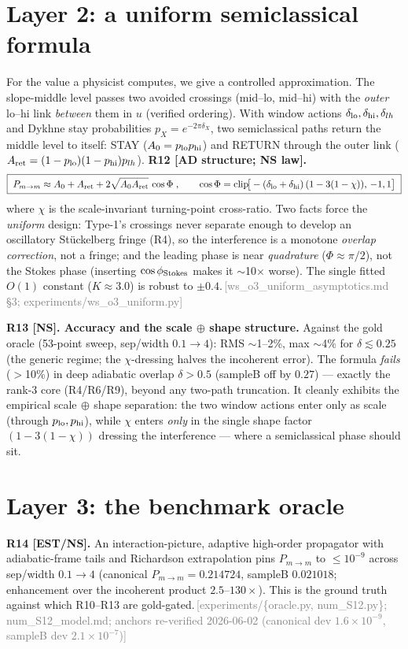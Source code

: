 \documentclass[aps,prd,reprint,nofootinbib]{revtex4-2}
\newcommand{\pnote}[1]{\textcolor{gray}{\footnotesize\,[#1]}}
\newcommand{\Pmid}{P_{m\to m}}   %
\begin{document}
\section{Layer 2: a uniform semiclassical formula}\label{sec:O3}
For the value a physicist computes, we give a controlled approximation. The slope-middle level passes
two avoided crossings (mid--lo, mid--hi) with the \emph{outer} lo--hi link \emph{between} them in $u$
(verified ordering). With window actions $\delta_{\rm lo},\delta_{\rm hi},\delta_{lh}$ and Dykhne
stay probabilities $p_X=e^{-2\pi\delta_X}$, two semiclassical paths return the middle level to
itself: STAY ($A_0=p_{\rm lo}p_{\rm hi}$) and RETURN through the outer link
($A_{\rm ret}=(1-p_{\rm lo})(1-p_{\rm hi})p_{lh}$). \textbf{R12 [AD structure; NS law].}
\begin{equation}
\boxed{\;\Pmid\approx A_0+A_{\rm ret}+2\sqrt{A_0 A_{\rm ret}}\,\cos\Phi\;,\qquad
\cos\Phi=\mathrm{clip}\!\big[-(\delta_{\rm lo}+\delta_{\rm hi})\,(1-3(1-\chi)),\,-1,1\big]\;}
\end{equation}
where $\chi$ is the scale-invariant turning-point cross-ratio. Two facts force the \emph{uniform}
design: Type-1's crossings never separate enough to develop an oscillatory St\"uckelberg fringe (R4),
so the interference is a monotone \emph{overlap correction}, not a fringe; and the leading phase is
near \emph{quadrature} ($\Phi\approx\pi/2$), not the Stokes phase (inserting $\cos\phi_{\rm Stokes}$
makes it $\sim$10$\times$ worse). The single fitted $O(1)$ constant ($K\approx3.0$) is robust to
$\pm0.4$.\pnote{ws\_o3\_uniform\_asymptotics.md \S3; experiments/ws\_o3\_uniform.py}

\textbf{R13 [NS]. Accuracy and the scale$\,\oplus\,$shape structure.} Against the gold oracle
(53-point sweep, sep/width $0.1\to4$): RMS $\sim$1--2\%, max $\sim$4\% for $\delta\lesssim0.25$ (the
generic regime; the $\chi$-dressing halves the incoherent error). The formula \emph{fails} ($>$10\%)
in deep adiabatic overlap $\delta>0.5$ (sampleB off by $0.27$) --- exactly the rank-3 core (R4/R6/R9),
beyond any two-path truncation. It cleanly exhibits the empirical scale$\,\oplus\,$shape separation:
the two window actions enter only as scale (through $p_{\rm lo},p_{\rm hi}$), while $\chi$ enters
\emph{only} in the single shape factor $(1-3(1-\chi))$ dressing the interference --- where a
semiclassical phase should sit.

\section{Layer 3: the benchmark oracle}\label{sec:oracle}
\textbf{R14 [EST/NS].} An interaction-picture, adaptive high-order propagator with adiabatic-frame
tails and Richardson extrapolation pins $\Pmid$ to $\le10^{-9}$ across sep/width $0.1\to4$ (canonical
$\Pmid=0.214724$, sampleB $0.021018$; enhancement over the incoherent product $2.5$--$130\times$).
This is the ground truth against which R10--R13 are gold-gated.\pnote{experiments/\{oracle.py,
num\_S12.py\}; num\_S12\_model.md; anchors re-verified 2026-06-02 (canonical dev $1.6\!\times\!10^{-9}$,
sampleB dev $2.1\!\times\!10^{-7}$)}
\end{document}
